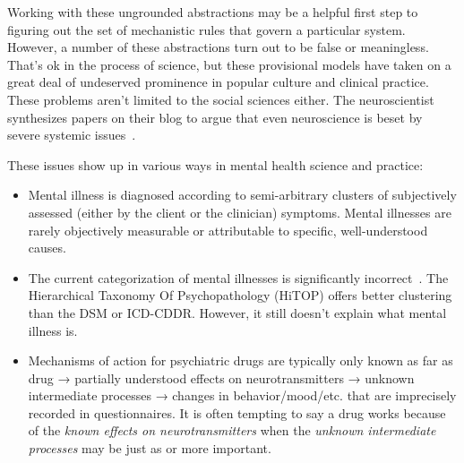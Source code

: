 \documentclass[11pt,oneside]{book}
\let\cite\parencite
\begin{document}
Working with these ungrounded abstractions may be a helpful first step to figuring out the set of mechanistic rules that govern a particular system. However, a number of these abstractions turn out to be false or meaningless. That's ok in the process of science, but these provisional models have taken on a great deal of undeserved prominence in popular culture and clinical practice. These problems aren't limited to the social sciences either. The neuroscientist  synthesizes papers on their blog to argue that even neuroscience is beset by severe systemic issues~\cite{hoelNeuroscience}.

These issues show up in various ways in mental health science and practice:
\begin{itemize}
    \item Mental illness is diagnosed according to semi-arbitrary clusters of subjectively assessed (either by the client or the clinician) symptoms. Mental illnesses are rarely objectively measurable or attributable to specific, well-understood causes.
    \item The current categorization of mental illnesses is significantly incorrect~\cite{kotov2017hierarchical}. The Hierarchical Taxonomy Of Psychopathology (HiTOP) offers better clustering than the DSM or ICD-CDDR. However, it still doesn't explain what mental illness is.
    \item Mechanisms of action for psychiatric drugs are typically only known as far as drug → partially understood effects on neurotransmitters → unknown intermediate processes → changes in behavior/mood/etc. that are imprecisely recorded in questionnaires. It is often tempting to say a drug works because of the \textit{known effects on neurotransmitters} when the \textit{unknown intermediate processes} may be just as or more important.
    

\end{itemize}
\end{document}
